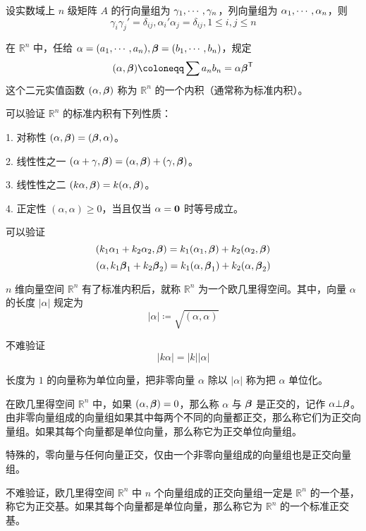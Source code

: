 \begin{theorem}
	设实数域上 $n$ 级矩阵 $A$ 的行向量组为 $\gamma_1,\cdots,\gamma_n$，列向量组为 $\alpha_1,\cdots,\alpha_n$，则
	\[\gamma_i\gamma_j'=\delta_{ij},\alpha_i'\alpha_j=\delta_{ij},1 \leqslant i,j \leqslant n\]
\end{theorem}

\begin{definition}
	在 $\mathbb{R}^n$ 中，任给 $\alpha = (a_1,\cdots,a_n),\boldsymbol{\beta}=(b_1,\cdots,b_n)$，规定
	\[(\alpha,\vbf{\beta}) \coloneqq  \sum a_nb_n = \alpha\transpose{\vbf{\beta}}\]
	这个二元实值函数 $(\alpha,\boldsymbol{\beta})$ 称为 $\mathbb{R}^n$ 的一个内积（通常称为标准内积）。
\end{definition}

可以验证 $\mathbb{R}^n$ 的标准内积有下列性质：

1. 对称性 $(\alpha,\boldsymbol{\beta}) = (\boldsymbol{\beta},\alpha)$。

2. 线性性之一 $(\alpha+\gamma,\boldsymbol{\beta}) = (\alpha,\boldsymbol{\beta}) + (\gamma,\boldsymbol{\beta})$。

3. 线性性之二 $(k\alpha,\boldsymbol{\beta}) = k(\alpha,\boldsymbol{\beta})$。

4. 正定性 $(\alpha,\alpha) \geqslant 0$，当且仅当 $\alpha=\boldsymbol{0}$ 时等号成立。

可以验证
\[(k_1\alpha_1+k_2\alpha_2, \boldsymbol{\beta}) = k_1(\alpha_1,\boldsymbol{\beta}) + k_2(\alpha_2,\boldsymbol{\beta})\]
\[(\alpha, k_1\boldsymbol{\beta}_1+k_2\boldsymbol{\beta}_2) = k_1(\alpha,\boldsymbol{\beta}_1) + k_2(\alpha,\boldsymbol{\beta}_2)\]

$n$ 维向量空间 $\mathbb{R}^n$ 有了标准内积后，就称 $\mathbb{R}^n$ 为一个欧几里得空间。其中，向量 $\alpha$ 的长度 $|\alpha|$ 规定为
\[|\alpha| \coloneqq  \sqrt{(\alpha,\alpha)}\]

不难验证
\[|k\alpha| = |k||\alpha|\]

长度为 $1$ 的向量称为单位向量，把非零向量 $\alpha$ 除以 $|\alpha|$ 称为把 $\alpha$ 单位化。

在欧几里得空间 $\mathbb{R}^n$ 中，如果 $(\alpha,\boldsymbol{\beta})=0$，那么称 $\alpha$ 与 $\boldsymbol{\beta}$ 是正交的，记作 $\alpha \bot \boldsymbol{\beta}$。由非零向量组成的向量组如果其中每两个不同的向量都正交，那么称它们为正交向量组。如果其每个向量都是单位向量，那么称它为正交单位向量组。

特殊的，零向量与任何向量正交，仅由一个非零向量组成的向量组也是正交向量组。

不难验证，欧几里得空间 $\mathbb{R}^n$ 中 $n$ 个向量组成的正交向量组一定是 $\mathbb{R}^n$ 的一个基，称它为正交基。如果其每个向量都是单位向量，那么称它为 $\mathbb{R}^n$ 的一个标准正交基。

